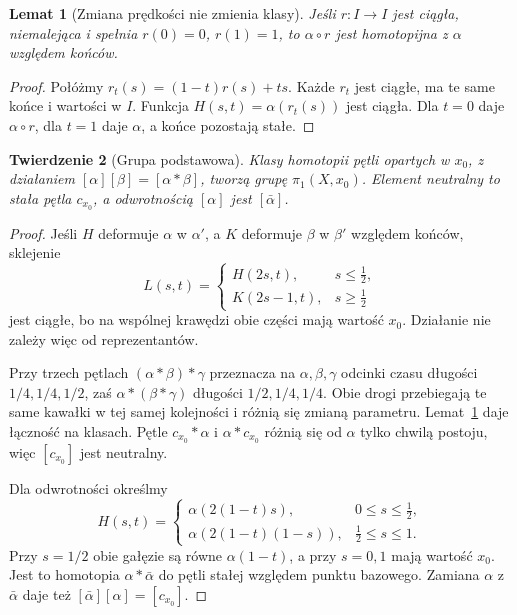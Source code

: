 \documentclass[11pt,a4paper,oneside]{report}
\theoremstyle{plain}
\newtheorem{twierdzenie}{Twierdzenie}[section]
\newtheorem{lemat}[twierdzenie]{Lemat}
\theoremstyle{definition}
\theoremstyle{remark}
\begin{document}
\begin{lemat}[Zmiana prędkości nie zmienia klasy]
\label{lem:reparametr-drogi}
Jeśli $r:I\to I$ jest ciągła, niemalejąca
i spełnia $r(0)=0$, $r(1)=1$, to
$\alpha\circ r$ jest homotopijna z $\alpha$
względem końców.
\end{lemat}
\begin{proof}
Połóżmy $r_t(s)=(1-t)r(s)+ts$.
Każde $r_t$ jest ciągłe, ma te same końce
i wartości w $I$. Funkcja
$H(s,t)=\alpha(r_t(s))$ jest ciągła.
Dla $t=0$ daje $\alpha\circ r$, dla $t=1$
daje $\alpha$, a końce pozostają stałe.
\end{proof}

\begin{twierdzenie}[Grupa podstawowa]
\label{thm:grupa-podstawowa}
Klasy homotopii pętli opartych w $x_0$,
z działaniem $[\alpha][\beta]=[\alpha*\beta]$,
tworzą grupę $\pi_1(X,x_0)$.
Element neutralny to stała pętla $c_{x_0}$,
a odwrotnością $[\alpha]$ jest $[\bar\alpha]$.
\end{twierdzenie}
\begin{proof}
Jeśli $H$ deformuje $\alpha$ w $\alpha'$,
a $K$ deformuje $\beta$ w $\beta'$
względem końców, sklejenie
\[
 L(s,t)=
 \begin{cases}
   H(2s,t),&s\leq\tfrac12,\\
   K(2s-1,t),&s\geq\tfrac12
 \end{cases}
\]
jest ciągłe, bo na wspólnej krawędzi
obie części mają wartość $x_0$.
Działanie nie zależy więc od reprezentantów.

Przy trzech pętlach $(\alpha*\beta)*\gamma$
przeznacza na $\alpha,\beta,\gamma$
odcinki czasu długości $1/4,1/4,1/2$,
zaś $\alpha*(\beta*\gamma)$ długości
$1/2,1/4,1/4$. Obie drogi przebiegają
te same kawałki w tej samej kolejności
i różnią się zmianą parametru.
Lemat~\ref{lem:reparametr-drogi} daje łączność
na klasach. Pętle $c_{x_0}*\alpha$
i $\alpha*c_{x_0}$ różnią się od $\alpha$
tylko chwilą postoju, więc
$[c_{x_0}]$ jest neutralny.

Dla odwrotności określmy
\[
 H(s,t)=
 \begin{cases}
  \alpha(2(1-t)s),&0\leq s\leq\tfrac12,\\
  \alpha(2(1-t)(1-s)),&\tfrac12\leq s\leq1.
 \end{cases}
\]
Przy $s=1/2$ obie gałęzie są równe
$\alpha(1-t)$, a przy $s=0,1$ mają
wartość $x_0$. Jest to homotopia
$\alpha*\bar\alpha$ do pętli stałej
względem punktu bazowego. Zamiana
$\alpha$ z $\bar\alpha$ daje też
$[\bar\alpha][\alpha]=[c_{x_0}]$.
\end{proof}
\end{document}
